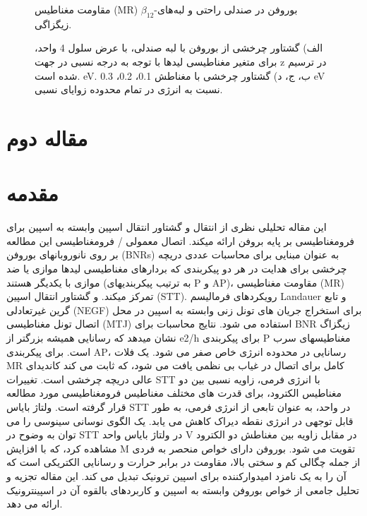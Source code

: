 \begin{figure}[!ht]
  \begin{latin}
    \centering
    \resizebox{0.45\textwidth}{!}{}
    \resizebox{0.45\textwidth}{!}{}
  \end{latin}
\caption{مقاومت مغناطیس (MR) $\beta_{12}$-بوروفن در صندلی راحتی و لبه‌های زیگزاگی.}
\label{fig:MR}
\end{figure}

\begin{figure}[!ht]
  \begin{latin}
    \centering
    \resizebox{0.45\textwidth}{!}{}
    \resizebox{0.45\textwidth}{!}{}
    \resizebox{0.45\textwidth}{!}{}
    \resizebox{0.45\textwidth}{!}{}
  \end{latin}
    \caption{الف) گشتاور چرخشی از بوروفن با لبه صندلی، با عرض سلول 4 واحد، برای متغیر مغناطیسی لیدها با توجه به درجه نسبی در جهت z در  ترسیم شده است. eV. ب، ج، د) گشتاور چرخشی با مغناطش 0.1، 0.2، 0.3 eV نسبت به انرژی در تمام محدوده زوایای نسبی.}
    \label{fig:stt}
\end{figure}

\section{مقاله دوم}
\section{مقدمه}
این مقاله تحلیلی نظری از انتقال و گشتاور انتقال اسپین وابسته به اسپین برای فرومغناطیسی بر پایه بروفن ارائه میکند. اتصال معمولی / فرومغناطیسی این مطالعه بر روی نانوروبانهای بوروفن (BNRs) به عنوان مبنایی برای محاسبات عددی دریچه چرخشی برای هدایت در هر دو پیکربندی که بردارهای مغناطیسی لیدها موازی یا ضد موازی با یکدیگر هستند (به ترتیب پیکربندیهای P و AP)، مقاومت مغناطیسی (MR) تمرکز میکند. و گشتاور انتقال اسپین (STT). رویکردهای فرمالیسم Landauer و تابع گرین غیرتعادلی (NEGF) برای استخراج جریان های تونل زنی وابسته به اسپین در محل اتصال تونل مغناطیسی (MTJ) استفاده می شود. نتایج محاسبات برای BNR زیگزاگ نشان میدهد که رسانایی همیشه بزرگتر از e2/h برای پیکربندی P مغناطیسهای سرب است. برای پیکربندی AP، رسانایی در محدوده انرژی خاص صفر می شود. یک فلات MR کامل برای اتصال در غیاب بی نظمی یافت می شود، که ثابت می کند کاندیدای عالی دریچه چرخشی است. تغییرات STT با انرژی فرمی، زاویه نسبی بین دو مغناطیس الکترود، برای قدرت های مختلف مغناطیس فرومغناطیسی مورد مطالعه قرار گرفته است. ولتاژ بایاس STT در واحد، به عنوان تابعی از انرژی فرمی، به طور قابل توجهی در انرژی نقطه دیراک کاهش می یابد. یک الگوی نوسانی سینوسی را می توان به وضوح در STT در ولتاژ بایاس واحد V در مقابل زاویه بین مغناطش دو الکترود مشاهده کرد، که با افزایش M تقویت می شود. بوروفن دارای خواص منحصر به فردی از جمله چگالی کم و سختی بالا، مقاومت در برابر حرارت و رسانایی الکتریکی است که آن را به یک نامزد امیدوارکننده برای اسپین ترونیک تبدیل می کند. این مقاله تجزیه و تحلیل جامعی از خواص بوروفن وابسته به اسپین و کاربردهای بالقوه آن در اسپینترونیک ارائه می دهد.

